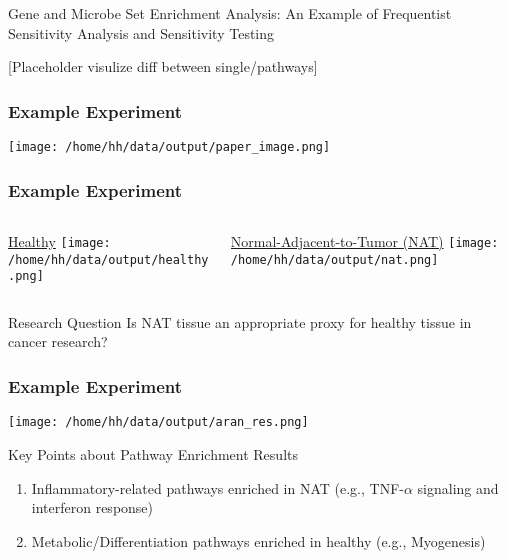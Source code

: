 \documentclass[11pt,t]{beamer}
\begin{document}
\begin{frame}

  \begin{center}
    Gene and Microbe Set Enrichment Analysis: An Example of Frequentist Sensitivity Analysis and Sensitivity Testing
  \end{center}

  \pause
  
  [Placeholder visulize diff between single/pathways]
  
\end{frame}

\begin{frame}
  \frametitle{Example Experiment}

  \begin{center}
    \texttt{[image: /home/hh/data/output/paper\_image.png]}
  \end{center}
  
\end{frame}

\begin{frame}
  \frametitle{Example Experiment}
   \begin{columns}
     \begin{column}{0.5\textwidth}
      \begin{center}
        \underline{Healthy}
        \texttt{[image: /home/hh/data/output/healthy.png]}
      \end{center}
    \end{column}
    \vrule{}
    \begin{column}{0.5\textwidth}  %
      \begin{center}
        \underline{Normal-Adjacent-to-Tumor (NAT)}
        \texttt{[image: /home/hh/data/output/nat.png]}
      \end{center}
    \end{column}
   \end{columns}
   \begin{exampleblock}{Research Question}
     Is NAT tissue an appropriate proxy for healthy tissue in cancer research?
   \end{exampleblock}
\end{frame}

\begin{frame}
  \frametitle{Example Experiment}
  \begin{center}
    \texttt{[image: /home/hh/data/output/aran\_res.png]}
  \end{center}
  \begin{exampleblock}{Key Points about Pathway Enrichment Results}
    \begin{enumerate}
      \item Inflammatory-related pathways enriched in NAT (e.g., TNF-\(\alpha\) signaling and interferon response)
      \item Metabolic/Differentiation pathways enriched in healthy (e.g., Myogenesis)
    \end{enumerate}
  \end{exampleblock}
\end{frame}
\end{document}
